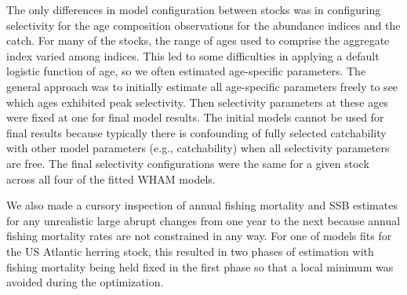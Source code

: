 \documentclass[12pt,letterpaper, leqno]{article}
\begin{document}

The only differences in model configuration between stocks was in configuring selectivity for the age composition observations for the abundance indices and the catch. For many of the stocks, the range of ages used to comprise the aggregate index varied among indices. This led to some difficulties in applying a default logistic function of age, so we often estimated age-specific parameters. The general approach was to initially estimate all age-specific parameters freely to see which ages exhibited peak selectivity. Then selectivity parameters at these ages were fixed at one for final model results. The initial models cannot be used for final results because typically there is confounding of fully selected catchability with other model parameters (e.g., catchability) when all selectivity parameters are free. The final selectivity configurations were the same for a given stock across all four of the fitted WHAM models.

We also made a cursory inspection of annual fishing mortality and SSB estimates for any unrealistic large abrupt changes from one year to the next because annual fishing mortality rates are not constrained in any way. For one of models fits for the US Atlantic herring stock, this resulted in two phases of estimation with fishing mortality being held fixed in the first phase so that a local minimum was avoided during the optimization. 

\end{document}

